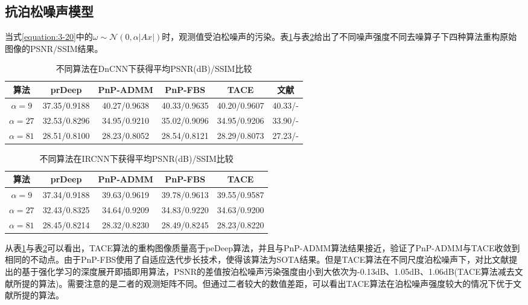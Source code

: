 \subsection{抗泊松噪声模型}
当式\eqref{equation:3-20}中的$\omega\sim{\mathcal{N}(0,\alpha\vert{Ax}\vert)}$时，观测值受泊松噪声的污染。表\ref{table:3-7}与表\ref{table:3-8}给出了不同噪声强度不同去噪算子下四种算法重构原始图像的PSNR/SSIM结果。
\begin{table}[!htbp]
	\def\arraystretch{1.4}\centering{}
	\caption{不同算法在DnCNN下获得平均PSNR(dB)/SSIM比较}
	\label{table:3-7}
	\begin{tabular*}{\linewidth}{@{}@{\extracolsep{\fill}}cccccc@{}}
		\toprule
		算法 & prDeep & PnP-ADMM & PnP-FBS & TACE & 文献\cite{Kaixuan}\\ %
		\midrule
		$\alpha=9$        & 37.35/0.9188   & 40.27/{\color{red}0.9638}  & {\color{red}40.33}/0.9635 & 40.20/0.9607 & {\color{red}40.33}/-  \\
		$\alpha=27$        & 32.53/0.8296   & 34.95/{\color{red}0.9210}  & {\color{red}35.02}/0.9096 & 34.95/0.9206  & 33.90/-	\\
		$\alpha=81$        & 28.51/0.8100   & 28.23/0.8052  & {\color{red}28.54}/{\color{red}0.8121} & 28.29/0.8073  & 27.23/-	\\
		\bottomrule
	\end{tabular*}
\end{table}
\begin{table}[!htbp]
	\def\arraystretch{1.4}\centering{}
	\caption{不同算法在IRCNN下获得平均PSNR(dB)/SSIM比较}
	\label{table:3-8}
	\begin{tabular*}{\linewidth}{@{}@{\extracolsep{\fill}}ccccc@{}}
		\toprule
		算法     & prDeep & PnP-ADMM & PnP-FBS & TACE\\ %
		\midrule
		$\alpha=9$         & 37.34/0.9188   & 39.63/{\color{red}0.9619}  & {\color{red}39.78}/0.9613 & 39.55/0.9587\\
		$\alpha=27$        & 32.43/0.8325   & 34.64/0.9209  & {\color{red}34.83}/{\color{red}0.9220} & 34.63/0.9200\\
		$\alpha=81$        & 28.45/0.8214   & 28.32/0.8230  & {\color{red}28.49}/{\color{red}0.8245} & 28.23/0.8220\\
		\bottomrule
	\end{tabular*}
\end{table}

从表\ref{table:3-7}与表\ref{table:3-8}可以看出，TACE算法的重构图像质量高于peDeep算法，并且与PnP-ADMM算法结果接近，验证了PnP-ADMM与TACE收敛到相同的不动点。由于PnP-FBS使用了自适应迭代步长技术，使得该算法为SOTA结果。但是TACE算法在不同尺度泊松噪声下，对比文献\cite{Kaixuan}提出的基于强化学习的深度展开即插即用算法，PSNR的差值按泊松噪声污染强度由小到大依次为-0.13dB、1.05dB、1.06dB(TACE算法减去文献\cite{Kaixuan}所提的算法)。需要注意的是二者的观测矩阵不同。但通过二者较大的数值差距，可以看出TACE算法在泊松噪声强度较大的情况下优于文献\cite{Kaixuan}所提的算法。

